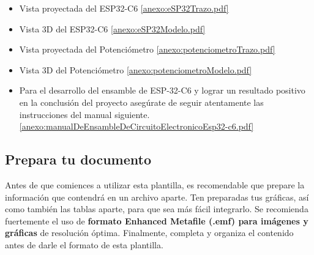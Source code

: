         \begin{itemize}
            \item Vista proyectada del ESP32-C6
            \ref{anexo:eSP32Trazo.pdf}
        \end{itemize}
        \begin{itemize}
            \item Vista 3D del ESP32-C6
            \ref{anexo:eSP32Modelo.pdf}
        \end{itemize}

        \begin{itemize}
            \item Vista proyectada del Potenciómetro
            \ref{anexo:potenciometroTrazo.pdf}
        \end{itemize}
        \begin{itemize}
            \item Vista 3D del Potenciómetro
            \ref{anexo:potenciometroModelo.pdf}
        \end{itemize}


        
        \begin{itemize}
            \item Para el desarrollo del ensamble de ESP-32-C6 y lograr un resultado positivo en la conclusión del proyecto asegúrate de seguir atentamente las instrucciones del manual siguiente.
            \ref{anexo:manualDeEnsambleDeCircuitoElectronicoEsp32-c6.pdf}
        \end{itemize}




    \subsection{Prepara tu documento}

        Antes de que comiences a utilizar esta plantilla, es recomendable que prepare la información que contendrá en un archivo aparte. 
        Ten preparadas tus gráficas, así como también las tablas aparte, para que sea más fácil integrarlo. 
        Se recomienda fuertemente el uso de \textbf{formato Enhanced Metafile (.emf) para imágenes y gráficas} de resolución óptima. 
        Finalmente, completa y organiza el contenido antes de darle el formato de esta plantilla. 



